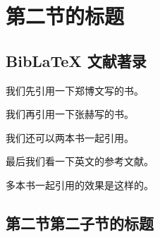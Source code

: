 
\section{第二节的标题}

\zhlipsum[1]

\subsection{BibLaTeX 文献著录}

\nocite{*}

我们先引用一下郑博文写的书\cite{rudin1976principleschinese3}。

我们再引用一下张赫写的书\cite{rudin1976principleschinese}。

我们还可以两本书一起引用\cite{rudin1976principleschinese,rudin1976principleschinese3}。

最后我们看一下英文的参考文献\cite{rudin1976principles}。

多本书一起引用的效果是这样的\cite{rudin1976principleschinese,rudin1976principleschinese3, rudin1976principles, rudin1976principleschinese2}。

\zhlipsum[1]

\subsection{第二节第二子节的标题}

\zhlipsum

